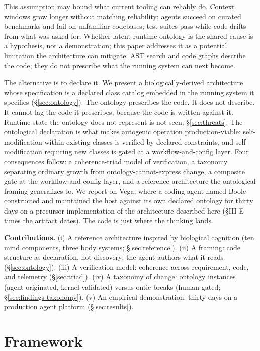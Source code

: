 \documentclass[conference,10pt]{IEEEtran}
\begin{document}
This assumption may bound what current tooling can reliably do.
Context windows grow longer without matching reliability; agents
succeed on curated benchmarks and fail on unfamiliar codebases; test
suites pass while code drifts from what was asked for. Whether latent
runtime ontology is the shared cause is a hypothesis, not a
demonstration; this paper addresses it as a potential limitation the
architecture can mitigate. AST search and code graphs describe the
code; they do not prescribe what the running system can next become.

The alternative is to declare it. We present a biologically-derived
architecture whose specification is a declared class catalog embedded in
the running system it specifies (§\ref{sec:ontology}). The
ontology prescribes the code. It does not describe. It cannot lag the
code it prescribes, because the code is written against it. Runtime
state the ontology does not represent is not seen; §\ref{sec:threats}. The ontological declaration is what makes autogenic operation
production-viable: self-modification within existing classes is verified
by declared constraints, and self-modification requiring new classes is
gated at a workflow-and-config layer. Four consequences follow: a
coherence-triad model of verification, a taxonomy separating ordinary
growth from ontology-cannot-express change, a composite gate at the
workflow-and-config layer, and a reference architecture the ontological
framing generalizes to. We report on Vega, where a coding agent named Boole
constructed and maintained the host against its own declared ontology
for thirty days on a precursor implementation of the architecture described here (§III-E times the artifact dates). The code is just where the thinking lands.

\textbf{Contributions.} (i) A reference architecture inspired by biological
cognition (ten mind components, three body systems; §\ref{sec:reference}).
(ii) A framing: code structure as declaration, not discovery: the
agent authors what it reads (§\ref{sec:ontology}). (iii) A
verification model: coherence across requirement, code, and telemetry
(§\ref{sec:triad}). (iv) A taxonomy of change: ontology
instances (agent-originated, kernel-validated) versus ontic breaks (human-gated;
§\ref{sec:findings-taxonomy}). (v) An empirical demonstration:
thirty days on a production agent platform (§\ref{sec:results}).

\section{Framework}\label{sec:framework}
\end{document}
